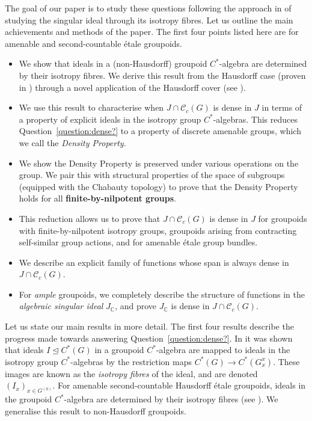 \documentclass[11pt, oneside, reqno]{amsart}
\newcommand{\Gu}{G^{(0)}}
\newcommand{\cg}{\mathscr{C}_c(G)}
\newcommand{\PRLsep}{\noindent\makebox[\linewidth]{\resizebox{0.3333\linewidth}{1pt}{$\bullet$}}\bigskip}
\theoremstyle{definition}
\theoremstyle{remark}
\numberwithin{equation}{section}
\begin{document}
\vspace{0.3cm}
The goal of our paper is to study these questions following the approach in \cite{Hume} of studying the singular ideal through its isotropy fibres. Let us outline the main achievements and methods of the paper. The first four points listed here are for amenable and second-countable \'etale groupoids.
\vspace{0.3cm}
\begin{itemize}
    \item We show that ideals in a (non-Hausdorff) groupoid $C^*$-algebra are determined by their isotropy fibres. We derive this result from the Hausdorff case (proven in \cite{CN24}) through a novel application of the Hausdorff cover (see \cite{BGHL}).
    \vspace{0.2cm}
    \item We use this result to characterise when $J \cap \cg$ is dense in $J$ in terms of a property of explicit ideals in the isotropy group $C^*$-algebras. This reduces Question~\ref{question:dense?} to a property of discrete amenable groups, which we call the \emph{Density Property}. 
    \vspace{0.2cm}
    \item We show the Density Property is preserved under various operations on the group. We pair this with structural properties of the space of subgroups (equipped with the Chabauty topology) to 
    prove that the Density Property holds for all \textbf{finite-by-nilpotent groups}.
    \vspace{0.2cm}
    \item This reduction allows us to prove that $J \cap \cg$ is dense in $J$ for groupoids with finite-by-nilpotent isotropy groups, groupoids arising from contracting self-similar group actions, and for amenable \'etale group bundles.
    \vspace{0.2cm}
    \item We describe an explicit family of functions whose span is always dense in $J \cap \cg$.
    \vspace{0.2cm}
    \item For \emph{ample} groupoids, we completely describe the structure of functions in the \emph{algebraic singular ideal} $J_\mathbb{C}$, and prove $J_{\mathbb{C}}$ is dense in $J \cap \cg$.
\end{itemize}

\PRLsep

Let us state our main results in more detail. The first four results describe the progress made towards answering Question~\ref{question:dense?}. In \cite{CN24} it was shown that ideals $I \trianglelefteq C^*(G)$ in a groupoid $C^*$-algebra are mapped to ideals in the isotropy group $C^*$-algebras by the restriction maps $C^*(G) \to C^*(G^x_x)$. These images are known as the \emph{isotropy fibres} of the ideal, and are denoted $(I_x)_{x \in \Gu}$. For amenable second-countable Hausdorff \'etale groupoids, ideals in the groupoid $C^*$-algebra are determined by their isotropy fibres (see \cite[Theorem~2.10]{CN24}). We generalise this result to non-Hausdorff groupoids.
\end{document}
